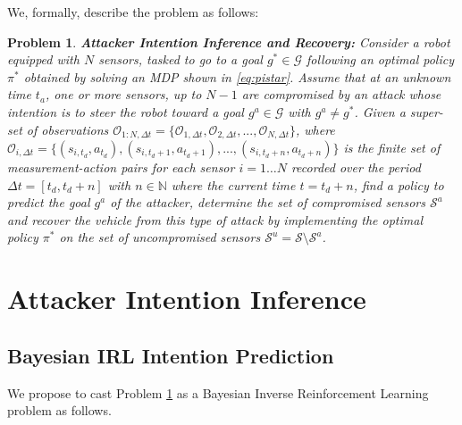 \documentclass[letterpaper, 10 pt, conference]{ieeeconf}  %
\newcommand{\Ne}{\mathbb {N}}
\newtheorem{problem}{Problem}
\newcommand\NB[1]{$\spadesuit$\footnote{NB: #1}}
\begin{document}
We, formally, describe the problem as follows:
\begin{problem}\label{prob:p1}
{ \bf Attacker Intention Inference and Recovery:} Consider a robot equipped with $N$ sensors, tasked to go to a goal $g^* \in \mathcal G$ following an optimal policy $\pi^*$ obtained by solving an MDP shown in \eqref{eq:pistar}. Assume that at an unknown time $t_a$, one or more sensors, up to $N-1$ are compromised by an attack whose intention is to steer the robot toward a goal $g^a \in \mathcal G$ with $g^a \neq g^*$. Given a super-set of observations $\mathcal{O}_{1:N,\Delta t} = \{\mathcal{O}_{1,\Delta t}, \mathcal{O}_{2,\Delta t}, ..., \mathcal{O}_{N,\Delta t}\}$, where $\mathcal{O}_{i,\Delta t} = \{(s_{i,t_d}, a_{t_d}), (s_{i,t_d+1}, a_{t_d+1}), ..., (s_{i,t_d+n}, a_{t_d+n})\}$ is the finite set of measurement-action pairs for each sensor $i=1 \ldots N$ recorded over the period $\Delta t = [t_d, t_d+n ]$ with $n \in \Ne$ where the current time $t=t_d+n$, find a policy to predict the goal $g^a$ of the attacker, determine the set of compromised sensors $\mathcal{S}^a$ and recover the vehicle from this type of attack by implementing the optimal policy $\pi^*$ on the set of uncompromised sensors $\mathcal S^u = \mathcal S \setminus \mathcal{S}^a$.


\end{problem}

\section{Attacker Intention Inference}\label{sec:approach}
\subsection{Bayesian IRL Intention Prediction}\label{sec:approach1}
We propose to cast Problem \ref{prob:p1} as a Bayesian Inverse Reinforcement Learning problem as follows. 
\end{document}
